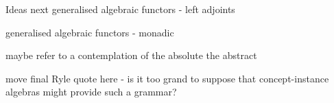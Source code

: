 \begin{frame}
\titlepage
{}
\end{frame}


\iffalse
\begin{frame}{test}
\begin{itemize}
\only<1->{\item Only 1-  One}
\only<2->{\item Only 2-  Two}
\onslide<3->{\item Onslide 3- Three}
\onslide<4->{\item Onslide 4- Four}
\end{itemize}
\end{frame}
\fi



\iffalse %

\fi %
\iffalse
















\fi



\iffalse







\fi

\begin{frame}{Ideas next}
generalised algebraic functors - left adjoints

generalised algebraic functors - monadic

maybe refer to a contemplation of the absolute the abstract

move final Ryle quote here - is it too grand to suppose that concept-instance algebras might provide such a grammar?
\end{frame}

